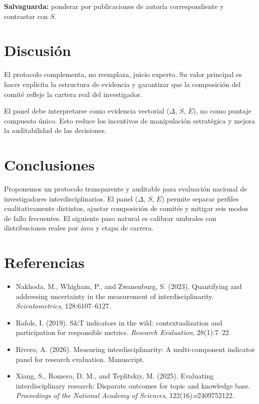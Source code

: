 \documentclass[
]{article}
\providecommand{\tightlist}{%
  \setlength{\itemsep}{0pt}\setlength{\parskip}{0pt}}
\begin{document}
\textbf{Salvaguarda:} ponderar por publicaciones de autoría
correspondiente y contrastar con \(S\).

\hypertarget{discusiuxf3n}{%
\section{Discusión}\label{discusiuxf3n}}

El protocolo complementa, no reemplaza, juicio experto. Su valor
principal es hacer explícita la estructura de evidencia y garantizar que
la composición del comité refleje la cartera real del investigador.

El panel debe interpretarse como evidencia vectorial (\(\Delta\), \(S\),
\(E\)), no como puntaje compuesto único. Esto reduce los incentivos de
manipulación estratégica y mejora la auditabilidad de las decisiones.

\hypertarget{conclusiones}{%
\section{Conclusiones}\label{conclusiones}}

Proponemos un protocolo transparente y auditable para evaluación
nacional de investigadores interdisciplinarios. El panel (\(\Delta\),
\(S\), \(E\)) permite separar perfiles cualitativamente distintos,
ajustar composición de comités y mitigar seis modos de fallo frecuentes.
El siguiente paso natural es calibrar umbrales con distribuciones reales
por área y etapa de carrera.

\hypertarget{referencias}{%
\section{Referencias}\label{referencias}}

\begin{itemize}
\tightlist
\item
  Nakhoda, M., Whigham, P., and Zwanenburg, S. (2023). Quantifying and
  addressing uncertainty in the measurement of interdisciplinarity.
  \emph{Scientometrics}, 128:6107--6127.
\item
  Rafols, I. (2019). S\&T indicators in the wild: contextualization and
  participation for responsible metrics. \emph{Research Evaluation},
  28(1):7--22.
\item
  Rivero, A. (2026). Measuring interdisciplinarity: A multi-component
  indicator panel for research evaluation. Manuscript.
\item
  Xiang, S., Romero, D. M., and Teplitskiy, M. (2025). Evaluating
  interdisciplinary research: Disparate outcomes for topic and knowledge
  base. \emph{Proceedings of the National Academy of Sciences},
  122(16):e2409752122.
\end{itemize}
\end{document}
